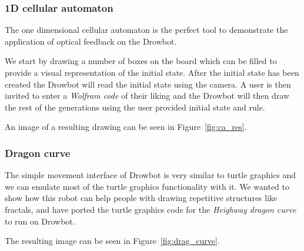 \documentclass[a4paper,10pt]{article}
\begin{document}
\subsubsection*{1D cellular automaton}


The one dimensional cellular automaton\cite{elemca} is the perfect
tool to demonstrate the application of optical feedback on the Drowbot.

We start by drawing a number of boxes on the board which can be
filled to provide a visual representation of the initial state.
After the initial state has been created the
Drowbot will read the initial state using the camera.
A user is then invited to enter a \emph{Wolfram code}\cite{elemca} of their liking
and the Drowbot will then draw the rest of the generations
using the user provided initial state and rule.

An image of a resulting drawing can be seen in Figure~\ref{fig:ca_res}.



\subsubsection*{Dragon curve}

The simple movement interface of Drowbot is very similar to
turtle graphics and we can emulate most of the turtle graphics
functionality with it.
We wanted to show how this robot can help people with drawing
repetitive structures like fractals, and have ported the turtle
graphics code for the \emph{Heighway dragon curve}\cite{dragon} to run on Drowbot.

The resulting image can be seen in Figure~\ref{fig:drag_curve}.
\end{document}
